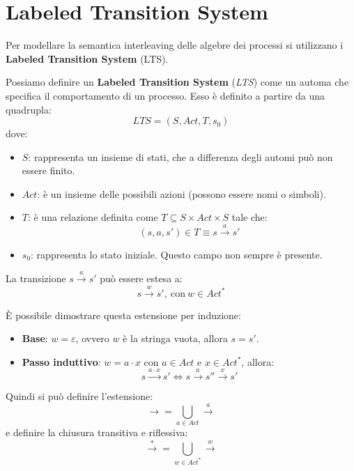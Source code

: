 \section{Labeled Transition System}
Per modellare la semantica interleaving delle algebre dei processi si utilizzano
i \textbf{Labeled Transition System} (LTS).
\begin{definizione}
    Possiamo definire un \textbf{Labeled Transition System} (\textit{LTS}) come
    un automa che specifica il comportamento di un processo. Esso è definito a
    partire da una quadrupla:
    \begin{equation}
        LTS = (S, Act, T, s_0)
    \end{equation}
    dove:
    \begin{itemize}
        \item \textbf{$S$}: rappresenta un insieme di stati, che a differenza
              degli automi può non essere finito.
        \item \textbf{$Act$}: è un insieme delle possibili azioni (possono essere
              nomi o simboli).
        \item \textbf{$T$}: è una relazione definita come
              $T \subseteq S \times Act \times S$ tale che:
              $$(s, a, s') \in T \equiv s \xrightarrow{a} s'$$
        \item \textbf{$s_0$}: rappresenta lo stato iniziale. Questo campo non
              sempre è presente.
    \end{itemize}
\end{definizione}
La transizione $s \xrightarrow{a} s'$ può essere estesa a:
\begin{equation}
    s \xrightarrow{w} s', \ \text{con} \ w \in Act^*
\end{equation}
\begin{dimostrazione}
    È possibile dimostrare questa estensione per induzione:
    \begin{itemize}
        \item \textbf{Base}: $w = \varepsilon$, ovvero $w$ è la stringa vuota,
              allora $s = s'$.
        \item \textbf{Passo induttivo}: $w = a \cdot x$ con $a \in Act$ e
              $x \in Act^*$, allora:
              \begin{equation}
                  s \xrightarrow{a\cdot x} s' \iff s \xrightarrow{a} s''
                  \xrightarrow{x} s'
              \end{equation}
    \end{itemize}
\end{dimostrazione}
Quindi si può definire l'estensione:
\begin{equation}
    \xrightarrow{}  = \bigcup_{a \in Act} \xrightarrow{a}
\end{equation}
e definire la chiusura transitiva e riflessiva:
\begin{equation}
    \xrightarrow{\ast}  = \bigcup_{w \in Act^{\ast}} \xrightarrow{w}
\end{equation}
